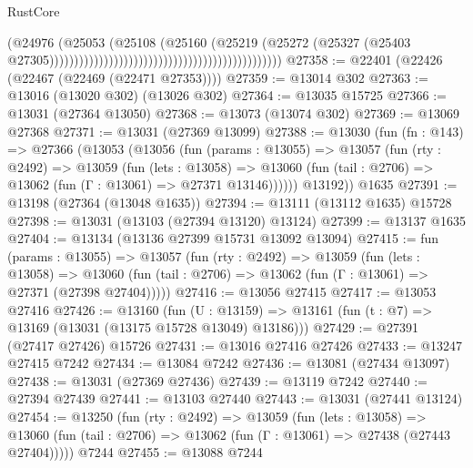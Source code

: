 \begin{lexlean}{RustCore}
\begin{coremodule}
                                                                                  (@24976
                                                                                    (@25053
                                                                                      (@25108
                                                                                        (@25160
                                                                                          (@25219
                                                                                            (@25272
                                                                                              (@25327
                                                                                                (@25403
                                                                                                  @27305)))))))))))))))))))))))))))))))))))))))))))))))
@27358 := @22401 (@22426 (@22467 (@22469 (@22471 @27353))))
@27359 := @13014 @302
@27363 := @13016 (@13020 @302) (@13026 @302)
@27364 := @13035 @15725
@27366 := @13031 (@27364 @13050)
@27368 := @13073 (@13074 @302)
@27369 := @13069 @27368
@27371 := @13031 (@27369 @13099)
@27388 := @13030
    (fun (fn : @143) =>
    @27366
      (@13053
        (@13056
          (fun (params : @13055) =>
          @13057
            (fun (rty : @2492) =>
            @13059
              (fun (lets : @13058) =>
              @13060 (fun (tail : @2706) => @13062 (fun (Γ : @13061) => @27371 @13146))))))
        @13192))
    @1635
@27391 := @13198 (@27364 (@13048 @1635))
@27394 := @13111 (@13112 @1635) @15728
@27398 := @13031 (@13103 (@27394 @13120) @13124)
@27399 := @13137 @1635
@27404 := @13134 (@13136 @27399 @15731 @13092 @13094)
@27415 := fun (params : @13055) =>
  @13057
    (fun (rty : @2492) =>
    @13059
      (fun (lets : @13058) =>
      @13060 (fun (tail : @2706) => @13062 (fun (Γ : @13061) => @27371 (@27398 @27404)))))
@27416 := @13056 @27415
@27417 := @13053 @27416
@27426 := @13160
    (fun (U : @13159) => @13161 (fun (t : @7) => @13169 (@13031 (@13175 @15728 @13049) @13186)))
@27429 := @27391 (@27417 @27426) @15726
@27431 := @13016 @27416 @27426
@27433 := @13247 @27415 @7242
@27434 := @13084 @7242
@27436 := @13081 (@27434 @13097)
@27438 := @13031 (@27369 @27436)
@27439 := @13119 @7242
@27440 := @27394 @27439
@27441 := @13103 @27440
@27443 := @13031 (@27441 @13124)
@27454 := @13250
    (fun (rty : @2492) =>
    @13059
      (fun (lets : @13058) =>
      @13060 (fun (tail : @2706) => @13062 (fun (Γ : @13061) => @27438 (@27443 @27404)))))
    @7244
@27455 := @13088 @7244

\end{coremodule}
\end{lexlean}
